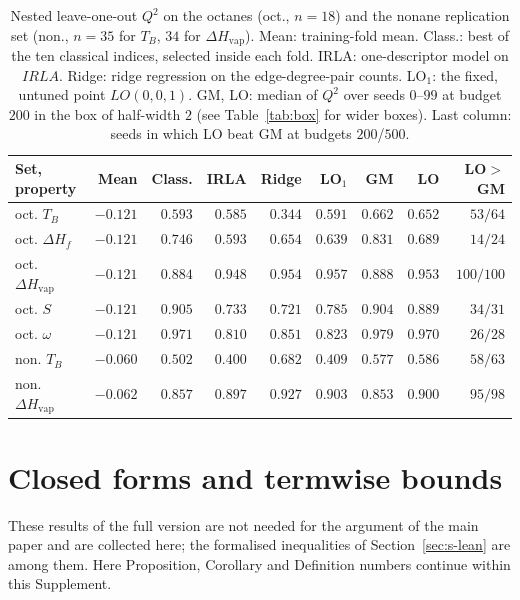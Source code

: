 \documentclass[a5paper, 10pt]{article}
\theoremstyle{plain}
\theoremstyle{remark}
\theoremstyle{definition}
\begin{document}
\begin{table}[htbp]
\centering
\caption{Nested leave-one-out $Q^2$ on the octanes (oct., $n = 18$) and
the nonane replication set (non., $n = 35$ for $T_B$, $34$ for
$\Delta H_{\mathrm{vap}}$). Mean: training-fold mean. Class.: best of the
ten classical indices, selected inside each fold. IRLA: one-descriptor
model on $IRLA$. Ridge: ridge regression on the edge-degree-pair counts.
LO$_1$: the fixed, untuned point $LO(0,0,1)$. GM, LO: median of $Q^2$
over seeds $0$--$99$ at budget $200$ in the box of half-width $2$
(see Table~\ref{tab:box} for wider boxes). Last column: seeds in which
LO beat GM at budgets $200$/$500$.}
\label{tab:external}
\small
\setlength{\tabcolsep}{2pt}
\begin{tabular}{lrrrrrrrr}
\toprule
Set, property & Mean & Class. & IRLA & Ridge & LO$_1$ & GM & LO & LO$>$GM\\
\midrule
oct. $T_B$ & $-0.121$ & $0.593$ & $0.585$ & $0.344$ & $0.591$ & $0.662$ & $0.652$ & $53/64$\\
oct. $\Delta H_f$ & $-0.121$ & $0.746$ & $0.593$ & $0.654$ & $0.639$ & $0.831$ & $0.689$ & $14/24$\\
oct. $\Delta H_{\mathrm{vap}}$ & $-0.121$ & $0.884$ & $0.948$ & $0.954$ & $0.957$ & $0.888$ & $0.953$ & $100/100$\\
oct. $S$ & $-0.121$ & $0.905$ & $0.733$ & $0.721$ & $0.785$ & $0.904$ & $0.889$ & $34/31$\\
oct. $\omega$ & $-0.121$ & $0.971$ & $0.810$ & $0.851$ & $0.823$ & $0.979$ & $0.970$ & $26/28$\\
non. $T_B$ & $-0.060$ & $0.502$ & $0.400$ & $0.682$ & $0.409$ & $0.577$ & $0.586$ & $58/63$\\
non. $\Delta H_{\mathrm{vap}}$ & $-0.062$ & $0.857$ & $0.897$ & $0.927$ & $0.903$ & $0.853$ & $0.900$ & $95/98$\\
\bottomrule
\end{tabular}
\end{table}

\singlespacing
\section{Closed forms and termwise bounds}\label{sec:s-bounds}

These results of the full version are not needed for the argument of the main paper and are collected here; the formalised inequalities of Section~\ref{sec:s-lean} are among them. Here Proposition, Corollary and Definition numbers continue within this Supplement.
\end{document}
